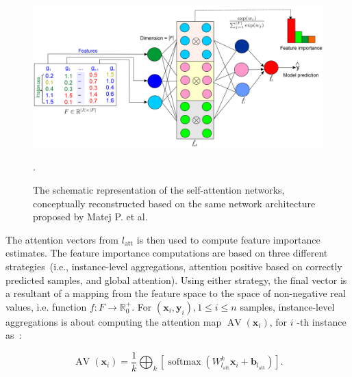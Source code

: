\begin{figure}
	\centering
	\includegraphics[scale=0.6]{images/san.png}	
	\caption{The schematic representation of the self-attention networks, conceptually reconstructed based on the same network architecture proposed by Matej P. et al.~\cite{vskrlj2020feature}}.
	\label{fig:san}
\end{figure}

\hspace*{3.5mm} The attention vectors from $l_{\text {att}}$ is then used to compute feature importance estimates. The feature importance computations are based on three different strategies~(i.e., instance-level aggregations, attention positive based on correctly predicted samples, and global attention). Using either strategy,  the final vector is a resultant of a mapping from the feature space to the space of non-negative real values, i.e. function $f: F \rightarrow \mathbb{R}_{0}^{+}$. 
For $\left(\boldsymbol{x}_{i}, \boldsymbol{y}_{i}\right), 1 \leq i \leq n$ samples, instance-level aggregations is about computing the attention map $\operatorname{AV}\left(\boldsymbol{x}_{i}\right)$, for $i$ -th instance as~\cite{vskrlj2020feature}: 

\begin{equation}
    \operatorname{AV}\left(\boldsymbol{x}_{i}\right)=\frac{1}{k} \bigoplus_{k}\left[\operatorname{softmax}\left(W_{l_{\mathrm{att}}}^{k} \boldsymbol{x}_{i}+\boldsymbol{b}_{l_{\mathrm{att}}}\right)\right].
\end{equation}

